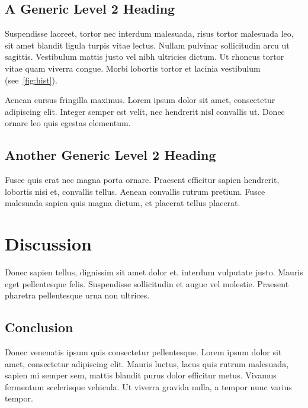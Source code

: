 \documentclass[a4paper,12pt,stu,donotrepeattitle,floatsintext,twoside]{apa7}
\begin{document}
\subsection{A Generic Level 2 Heading}

Suspendisse laoreet, tortor nec interdum malesuada, risus tortor malesuada leo, sit amet blandit ligula turpis vitae lectus. Nullam pulvinar sollicitudin arcu ut sagittis. Vestibulum mattis justo vel nibh ultricies dictum. Ut rhoncus tortor vitae quam viverra congue. Morbi lobortis tortor et lacinia vestibulum (see~\cref{fig:hist}).


Aenean cursus fringilla maximus. Lorem ipsum dolor sit amet, consectetur adipiscing elit. Integer semper est velit, nec hendrerit nisl convallis ut. Donec ornare leo quis egestas elementum.

\subsection{Another Generic Level 2 Heading}

Fusce quis erat nec magna porta ornare. Praesent efficitur sapien hendrerit, lobortis nisi et, convallis tellus. Aenean convallis rutrum pretium. Fusce malesuada sapien quis magna dictum, et placerat tellus placerat.

\section{Discussion}

Donec sapien tellus, dignissim sit amet dolor et, interdum vulputate justo. Mauris eget pellentesque felis. Suspendisse sollicitudin et augue vel molestie. Praesent pharetra pellentesque urna non ultrices.

\subsection{Conclusion}

Donec venenatis ipsum quis consectetur pellentesque. Lorem ipsum dolor sit amet, consectetur adipiscing elit. Mauris luctus, lacus quis rutrum malesuada, sapien mi semper sem, mattis blandit purus dolor efficitur metus. Vivamus fermentum scelerisque vehicula. Ut viverra gravida nulla, a tempor nunc varius tempor.
\end{document}
